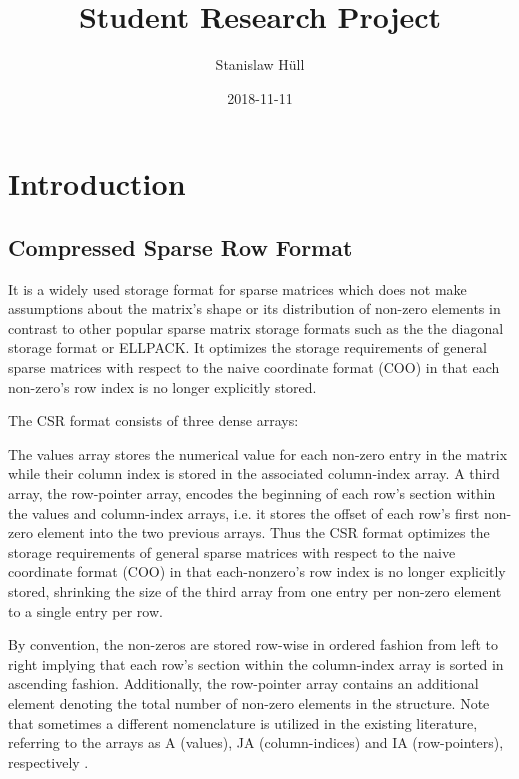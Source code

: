 \documentclass{article}
\author{Stanislaw Hüll}
\title{Student Research Project}
\date{2018-11-11}
\begin{document}
\maketitle

\section{Introduction}

  \subsection{Compressed Sparse Row Format}
    It is a widely used storage format for sparse matrices which does not make assumptions about the matrix's shape
    or its distribution of non-zero elements in contrast to other popular sparse matrix storage formats such as the
    the diagonal storage format or ELLPACK. It optimizes the storage requirements of general sparse matrices with
    respect to the naive coordinate format (COO) in that each non-zero's row index is no longer explicitly stored.

    The CSR format consists of three dense arrays:

    The values array stores the numerical value for each non-zero entry in the matrix while their column index is stored
    in the associated column-index array. A third array, the row-pointer array, encodes the beginning of each row's
    section within the values and column-index arrays, i.e. it stores the offset of each row's first non-zero element
    into the two previous arrays. Thus the CSR format optimizes the storage requirements of general sparse matrices with
    respect to the naive coordinate format (COO) in that each-nonzero's row index is no longer explicitly stored,
    shrinking the size of the third array from one entry per non-zero element to a single entry per row.

    

    By convention, the non-zeros are stored row-wise in ordered fashion from left to right implying that each row's
    section within the column-index array is sorted in ascending fashion. Additionally, the row-pointer array contains
    an additional element denoting the total number of non-zero elements in the structure. Note that sometimes a
    different nomenclature is utilized in the existing literature, referring to the arrays as A (values), JA
    (column-indices) and IA (row-pointers), respectively \cite{sparskit}.
\end{document}
